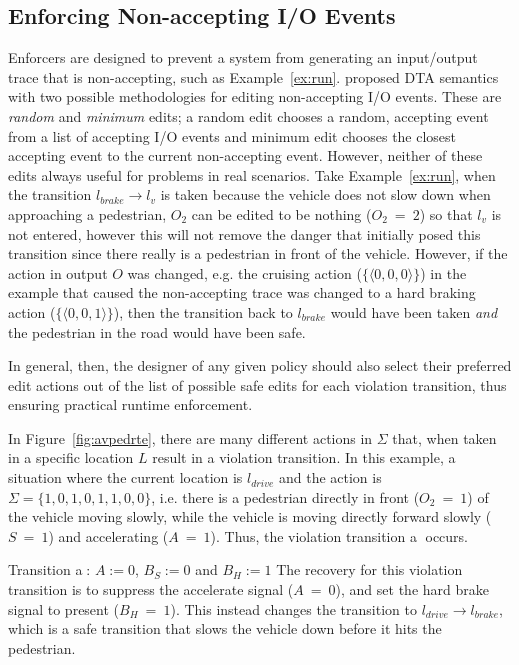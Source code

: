 \subsection{Enforcing Non-accepting I/O Events}
Enforcers are designed to prevent a system from generating an input/output trace that is non-accepting, such as Example~\ref{ex:run}.
\cite{recps} proposed \ac{DTA} semantics with two possible methodologies for editing non-accepting I/O events.
These are \textit{random} and \textit{minimum} edits; a random edit chooses a random, accepting event from a list of accepting I/O events and minimum edit chooses the closest accepting event to the current non-accepting event.
However, neither of these edits always useful for problems in real scenarios.
Take Example~\ref{ex:run}, when the transition $l_{brake} \rightarrow l_v$ is taken because the vehicle does not slow down when approaching a pedestrian, $O_2$ can be edited to be nothing ($O_2~=~2$) so that $l_v$ is not entered, however this will not remove the danger that initially posed this transition since there really is a pedestrian in front of the vehicle.
However, if the action in output ${O}$ was changed, e.g. the cruising action ($\{\langle 0, 0, 0 \rangle\}$) in the example that caused the non-accepting trace was changed to a hard braking action ($\{\langle 0, 0, 1 \rangle\}$), then the transition back to $l_{brake}$ would have been taken \textit{and} the pedestrian in the road would have been safe.

In general, then, the designer of any given policy should also select their preferred edit actions out of the list of possible safe edits for each violation transition, thus ensuring practical runtime enforcement.

\begin{example}
	In Figure~\ref{fig:avpedrte}, there are many different actions in $\Sigma$ that, when taken in a specific location $L$ result in a violation transition.
	In this example, a situation where the current location is $l_{drive}$ and the action is $\Sigma = \{1, 0, 1, 0, 1, 1, 0, 0\}$, i.e. there is a pedestrian directly in front ($O_2~=~1$) of the vehicle moving slowly, while the vehicle is moving directly forward slowly ($S~=~1$) and accelerating ($A~=~1$).
	Thus, the violation transition \textcircled{a} occurs.
	\squishlist
	\item Transition \textcircled{a}: $A := 0$, $B_S := 0$ and $B_H := 1$
	\squishend
	The recovery for this violation transition is to suppress the accelerate signal ($A~=~0$), and set the hard brake signal to present ($B_H~=~1$).
	This instead changes the transition to $l_{drive} \rightarrow l_{brake}$, which is a safe transition that slows the vehicle down before it hits the pedestrian.
\end{example}















